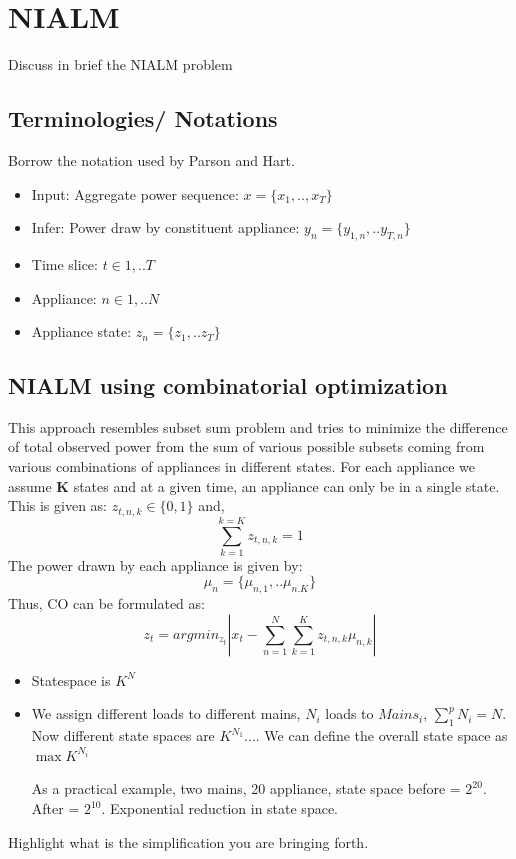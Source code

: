 \documentclass[conference]{IEEEtran}
\begin{document}
\section{NIALM}
Discuss in brief the NIALM problem
\subsection{Terminologies/ Notations}
Borrow the notation used by Parson and Hart.
\begin{itemize}
\item Input: Aggregate power sequence: $x=\{ x_1,..,x_T\}$
\item Infer: Power draw by constituent appliance: $y_n=\{y_{1,n},..y_{T,n}\}$
\item Time slice: $t\in {1,..T}$
\item Appliance: $n\in{1,..N}$
\item Appliance state: $z_n=\{z_1,..z_T\}$
\end{itemize}

\subsection{NIALM using combinatorial optimization}
This approach resembles subset sum problem and tries to minimize the difference of total observed power from the sum of various possible subsets coming from various combinations of appliances in different states. For each appliance we assume \textbf{K} states and at a given time, an appliance can only be in a single state. This is given as: 
$z_{t,n,k}\in\{0,1\} $ and, $$\sum\limits_{k=1}^{k=K} z_{t,n,k}=1$$The power drawn by each appliance is given by:
$$\mu_n=\{\mu_{n,1},..\mu_{n.K}\}$$ Thus, CO can be formulated as:
$$z_t=arg min_{z_t}|x_t-\sum\limits_{n=1}^{N}\sum\limits_{k=1}^{K}z_{t,n,k}\mu_{n,k}|$$

\begin{itemize}
\item Statespace is $K^N$
\item We assign different loads to different mains, $N_i$ loads to $Mains_i$, $\sum\limits_{1}^{p}{N_i}=N$. Now different state spaces are
$K^{N_1}$.... We can define the overall state space as $\max{K^{N_i}}$

As a practical example, two mains, 20 appliance, state space before = $2^{20}$. After = $2^{10}$. Exponential reduction in state space.
\end{itemize}

Highlight what is the simplification you are bringing forth.
\end{document}
